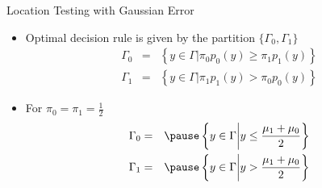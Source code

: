 \documentclass[t]{beamer}
\begin{document}
\begin{frame}{Location Testing with Gaussian Error}
  \footnotesize
  \begin{itemize}
    \item Optimal decision rule is given by the partition $\{\Gamma_0,\Gamma_1\}$
      \begin{eqnarray*}
        \Gamma_0 & = & \left\{y \in \Gamma \lvert \pi_0 p_0(y) \geq \pi_1 p_1(y) \right\} \\
        \Gamma_1 & = & \left\{y \in \Gamma \lvert \pi_1 p_1(y) > \pi_0 p_0(y) \right\} 
      \end{eqnarray*}
    \item \pause For $\pi_0 = \pi_1 = \frac{1}{2}$
      \begin{eqnarray*}
        \Gamma_0 & = & \pause \left\{y \in \Gamma \bigg| y \leq \frac{\mu_1+\mu_0}{2} \right\} \\
        \Gamma_1 & = & \pause \left\{y \in \Gamma \bigg| y >  \frac{\mu_1+\mu_0}{2} \right\} 
      \end{eqnarray*}
  \end{itemize}
  \normalsize
\end{frame}
\end{document}
